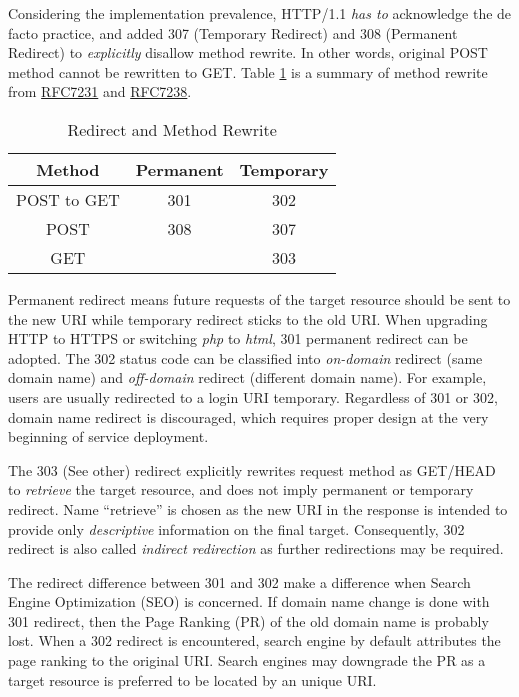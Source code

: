 Considering the implementation prevalence, HTTP/1.1 \textit{has
  to} acknowledge the de facto practice, and added 307 (Temporary
Redirect) and 308 (Permanent Redirect) to \textit{explicitly}
disallow method rewrite. In other words, original POST method
cannot be rewritten to GET. Table
\ref{tab:redirect-and-method-rewrite} is a summary of method
rewrite from \href{https://tools.ietf.org/html/rfc7231}{RFC7231}
and \href{https://tools.ietf.org/html/rfc7238}{RFC7238}.

\begin{table}[tbp]
  \centering
  \begin{tabular}[tbp]{c|c|c}
    \toprule{}
    Method & Permanent & Temporary \\
    \midrule{}
    POST to GET & 301 & 302 \\
    POST & 308 & 307 \\
    GET & & 303 \\
    \bottomrule
  \end{tabular}
  \caption{Redirect and Method Rewrite}
  \label{tab:redirect-and-method-rewrite}
\end{table}

Permanent redirect means future requests of the target resource
should be sent to the new URI while temporary redirect sticks to
the old URI. When upgrading HTTP to HTTPS or switching
\textit{php} to \textit{html}, 301 permanent redirect can be
adopted. The 302 status code can be classified into
\textit{on-domain} redirect (same domain name) and
\textit{off-domain} redirect (different domain name). For example,
users are usually redirected to a login URI temporary. Regardless
of 301 or 302, domain name redirect is discouraged, which requires
proper design at the very beginning of service deployment.

The 303 (See other) redirect explicitly rewrites request method as
GET/HEAD to \textit{retrieve} the target resource, and does not
imply permanent or temporary redirect. Name ``retrieve'' is chosen
as the new URI in the response is intended to provide only
\textit{descriptive} information on the final
target. Consequently, 302 redirect is also called \textit{indirect
  redirection} as further redirections may be required.

The redirect difference between 301 and 302 make a difference when
Search Engine Optimization (SEO) is concerned. If domain name
change is done with 301 redirect, then the Page Ranking (PR) of
the old domain name is probably lost. When a 302 redirect is
encountered, search engine by default attributes the page ranking
to the original URI. Search engines may downgrade the PR as a
target resource is preferred to be located by an unique URI.

